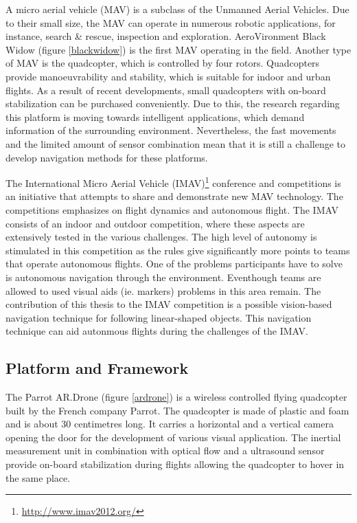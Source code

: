 \documentclass[a4paper]{article}
\begin{document}
A micro aerial vehicle (MAV) is a subclass of the Unmanned Aerial Vehicles. Due to their small size, the MAV can operate in numerous robotic applications, for instance, search \&  rescue, inspection and exploration. AeroVironment Black Widow\cite{Grasmeyer2001} (figure \ref{blackwidow}) is the first MAV operating in the field. Another type of MAV is the quadcopter, which is controlled by four rotors. Quadcopters provide manoeuvrability and stability, which is suitable for indoor and urban flights. As a result of recent developments, small quadcopters with on-board stabilization can be purchased conveniently. Due to this, the research regarding this platform is moving towards intelligent applications, which demand information of the surrounding environment. Nevertheless, the fast movements and the limited amount of sensor combination mean that it is still a challenge to develop navigation methods for these platforms.

The International Micro Aerial Vehicle (IMAV)\footnote{\url{http://www.imav2012.org/}} conference and competitions is an initiative that attempts to share and demonstrate new MAV technology. The competitions emphasizes on flight dynamics and autonomous flight. The IMAV consists of an indoor and outdoor competition, where these aspects are extensively tested in the various challenges. The high level of autonomy is stimulated in this competition as the rules give significantly more points to teams that operate autonomous flights. One of the problems participants have to solve is autonomous navigation through the environment. Eventhough teams are allowed to used visual aids (ie. markers) problems in this area remain. The contribution of this thesis to the IMAV competition is a possible vision-based navigation technique for following linear-shaped objects. This navigation technique can aid autonmous flights during the challenges of the IMAV.
 

\subsection{Platform and Framework}
The Parrot AR.Drone (figure \ref{ardrone}) is a wireless controlled flying quadcopter built by the French company Parrot. The quadcopter is made of plastic and foam and is about 30 centimetres long. It carries a horizontal and a vertical camera opening the door for the development of various visual application. The inertial measurement unit in combination with optical flow and a ultrasound sensor provide on-board stabilization during flights allowing the quadcopter to hover in the same place. 
\end{document}
